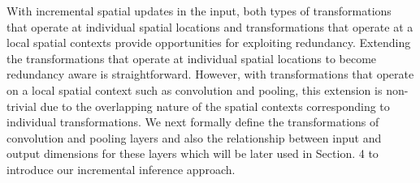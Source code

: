 With incremental spatial updates in the input, both types of transformations that operate at individual spatial locations and transformations that operate at a local spatial contexts provide opportunities for exploiting redundancy. Extending the transformations that operate at individual spatial locations to become redundancy aware is straightforward. However, with transformations that operate on a local spatial context such as convolution and pooling, this extension is non-trivial due to the overlapping nature of the spatial contexts corresponding to individual transformations. We next formally define the transformations of convolution and pooling layers and also the relationship between input and output dimensions for these layers which will be later used in Section. 4 to introduce our incremental inference approach.

